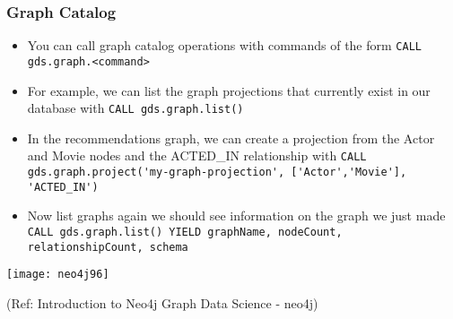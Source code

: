 \begin{frame}[fragile]\frametitle{Graph Catalog}

\begin{itemize}
\item You can call graph catalog operations with commands of the form \lstinline|CALL gds.graph.<command>|
\item For example, we can list the graph projections that currently exist in our database with  \lstinline|CALL gds.graph.list()|
\item In the recommendations graph, we can create a projection from the Actor and Movie nodes and the ACTED\_IN relationship with \lstinline|CALL gds.graph.project('my-graph-projection', ['Actor','Movie'], 'ACTED_IN')|
\item Now list graphs again we should see information on the graph we just made \lstinline|CALL gds.graph.list() YIELD graphName, nodeCount, relationshipCount, schema|
\end{itemize}

\begin{center}
\texttt{[image: neo4j96]}
\end{center}	

{\tiny (Ref: Introduction to Neo4j Graph Data Science - neo4j)}
\end{frame}

